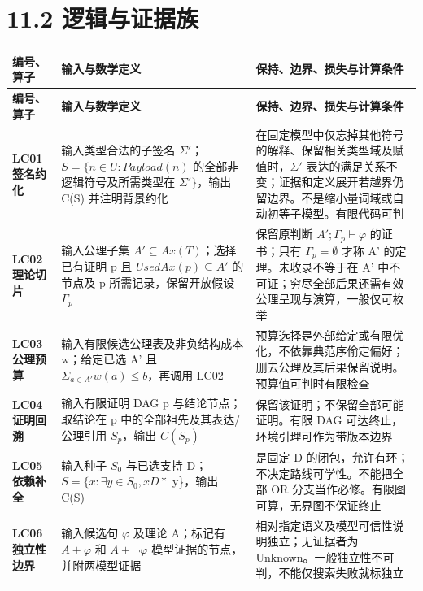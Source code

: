 \documentclass[UTF8,a4paper,zihao=-4,fontset=windows,openany]{ctexbook}
\def\mathrm#1{#1}%
\begin{document}
\section{11.2 逻辑与证据族}
\begingroup\small\setlength{\tabcolsep}{4pt}
\begin{longtable}{>{\raggedright\arraybackslash}p{}>{\raggedright\arraybackslash}p{}>{\raggedright\arraybackslash}p{}}
\toprule
\textbf{编号、算子} & \textbf{输入与数学定义} & \textbf{保持、边界、损失与计算条件} \\
\midrule
\endfirsthead
\toprule
\textbf{编号、算子} & \textbf{输入与数学定义} & \textbf{保持、边界、损失与计算条件} \\
\midrule
\endhead
\bottomrule
\endfoot
\bottomrule
\endlastfoot
\textbf{LC01 签名约化} & 输入类型合法的子签名 \(\Sigma'\)；\(S=\{n\in U:\mathrm{Payload}(n)\) 的全部非逻辑符号及所需类型在 \(\Sigma'\}\)，输出 C(S) 并注明背景约化 & 在固定模型中仅忘掉其他符号的解释、保留相关类型域及赋值时，\(\Sigma'\) 表达的满足关系不变；证据和定义展开若越界仍留边界。不是缩小量词域或自动初等子模型。有限代码可判 \\
\textbf{LC02 理论切片} & 输入公理子集 \(A'\subseteq\mathrm{Ax}(T)\)；选择已有证明 p 且 \(\mathrm{UsedAx}(p)\subseteq A'\) 的节点及 p 所需记录，保留开放假设 \(\Gamma_p\) & 保留原判断 \(A';\Gamma_p\vdash\varphi\) 的证书；只有 \(\Gamma_p=\emptyset\) 才称 A' 的定理。未收录不等于在 A' 中不可证；穷尽全部后果还需有效公理呈现与演算，一般仅可枚举 \\
\textbf{LC03 公理预算} & 输入有限候选公理表及非负结构成本 w；给定已选 A' 且 \(\Sigma_{a\in A'}w(a)\le b\)，再调用 LC02 & 预算选择是外部给定或有限优化，不依靠典范序偷定偏好；删去公理及其后果保留说明。预算值可判时有限检查 \\
\textbf{LC04 证明回溯} & 输入有限证明 DAG p 与结论节点；取结论在 p 中的全部祖先及其表达/公理引用 \(S_p\)，输出 \(C(S_p)\) & 保留该证明；不保留全部可能证明。有限 DAG 可达终止，环境引理可作为带版本边界 \\
\textbf{LC05 依赖补全} & 输入种子 \(S_{0}\) 与已选支持 D；\(S=\{x:\exists y\in S_{0},\mathrm{xD}*\) y\}，输出 C(S) & 是固定 D 的闭包，允许有环；不决定路线可学性。不能把全部 OR 分支当作必修。有限图可算，无界图不保证终止 \\
\textbf{LC06 独立性边界} & 输入候选句 \(\varphi\) 及理论 A；标记有 \(A+\varphi\) 和 \(A+\neg\varphi\) 模型证据的节点，并附两模型证据 & 相对指定语义及模型可信性说明独立；无证据者为 Unknown。一般独立性不可判，不能仅搜索失败就标独立 \\
\end{longtable}
\endgroup
\end{document}
